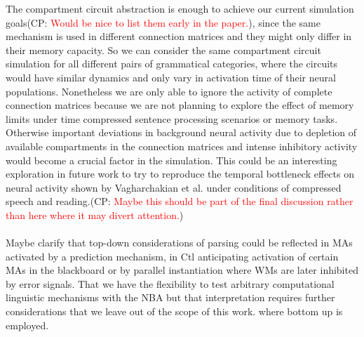 \documentclass[10pt]{article}
\newcommand{\noteCP}[1]{(CP: \textcolor{red}{#1})}
\begin{document}
The compartment circuit abstraction is enough to achieve our current simulation goals\noteCP{Would be nice to list them early in the paper.}, since the same mechanism is used in different connection matrices and they might only differ in their memory capacity.
So we can consider the same compartment circuit simulation for all different pairs of grammatical categories, where the circuits would have similar dynamics and only vary in activation time of their neural populations.
Nonetheless we are only able to ignore the activity of complete connection matrices because we are not planning to explore the effect of memory limits under time compressed sentence processing scenarios or memory tasks.
Otherwise important deviations in background neural activity due to depletion of available compartments in the connection matrices and intense inhibitory activity would become a crucial factor in the simulation.
This could be an interesting exploration in future work to try to reproduce the temporal bottleneck effects on neural activity shown by Vagharchakian et al. under conditions of compressed speech and reading\cite{Vagharchakian_2012}.\noteCP{Maybe this should be part of the final discussion rather than here where it may divert attention.}\\~\\

Maybe clarify that top-down considerations of parsing could be reflected in MAs activated by a prediction mechanism, in Ctl anticipating activation of certain MAs in the blackboard or by parallel instantiation where WMs are later inhibited by error signals.
That we have the flexibility to test arbitrary computational linguistic mechanisms with the NBA but that interpretation requires further considerations that we leave out of the scope of this work.
where bottom up is employed.\\~\\
\end{document}
